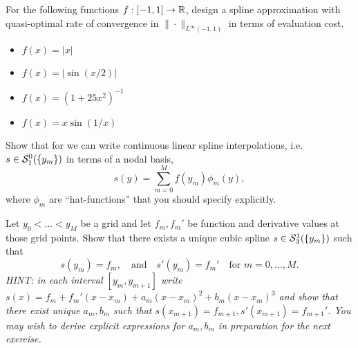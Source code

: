\begin{exercise}
    For the following functions $f : [-1,1] \to \mathbb{R}$, design a spline
    approximation with quasi-optimal rate of convergence in
    $\|\cdot\|_{L^\infty(-1,1)}$ in terms of evaluation cost. 
    \begin{itemize}
        \item $f(x) = |x|$ 
        \item $f(x) = |\sin(x/2)|$ 
        \item $f(x) = (1+25 x^2)^{-1}$
        \item $f(x) = x \sin(1/x)$ 
    \end{itemize}
\end{exercise}

\begin{exercise} Show that for we can write continuous linear
    spline interpolations, i.e. $s \in \mathcal{S}_1^0(\{y_m\})$ in terms of a nodal
    basis, 
    \[
        s(y) = \sum_{m = 0}^M f(y_m) \phi_m(y),
    \]
    where $\phi_m$ are ``hat-functions'' that you should specify 
    explicitly. 
\end{exercise}


\begin{exercise}
    Let $y_0 < \dots < y_M$ be a grid and let $f_m, f_m'$ be 
    function and derivative values at those grid points. Show that there 
    exists a unique cubic spline $s \in \mathcal{S}_3^1(\{y_m\})$ such that 
    \[
        s(y_m) = f_m, \quad \text{and} \quad 
        s'(y_m) = f_m' \quad \text{for } m = 0, \dots, M.    
    \]
    {\it HINT: in each interval $[y_{m}, y_{m+1}]$ write $s(x) = f_{m} + f_{m}'
        (x-x_{m}) + a_m (x-x_m)^2 + b_m (x-x_m)^3$ and show that there exist
        unique $a_m, b_m$ such that $s(x_{m+1}) = f_{m+1}, s'(x_{m+1}) =
        f_{m+1}'$. You may wish to derive explicit expressions for 
        $a_m, b_m$ in preparation for the next exercise.}
\end{exercise}


